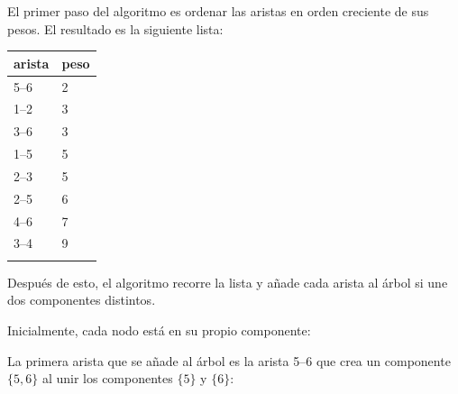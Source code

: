 \begin{samepage}
El primer paso del algoritmo es ordenar las
aristas en orden creciente de sus pesos.
El resultado es la siguiente lista:

\begin{tabular}{ll}
\\
arista & peso \\
\hline
5--6 & 2 \\
1--2 & 3 \\
3--6 & 3 \\
1--5 & 5 \\
2--3 & 5 \\
2--5 & 6 \\
4--6 & 7 \\
3--4 & 9 \\
\\
\end{tabular}
\end{samepage}

Después de esto, el algoritmo recorre la lista
y añade cada arista al árbol si une
dos componentes distintos.

Inicialmente, cada nodo está en su propio componente:

\begin{center}
\end{center}
La primera arista que se añade al árbol es
la arista 5--6 que crea un componente $\{5,6\}$
al unir los componentes $\{5\}$ y $\{6\}$:

